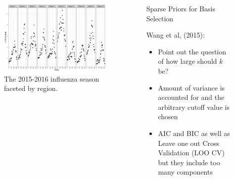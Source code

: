 \documentclass[final]{beamer}
\newlength{\sepwid}
\newlength{\onecolwid}
\newlength{\twocolwid}
\begin{document}
\begin{frame}[t]
\begin{columns}[t]
\begin{column}{\onecolwid}
\begin{figure}
\includegraphics[width=\linewidth]{plots/ILI.png}
\caption{The 2015-2016 influenza season faceted by region.}
\end{figure}


\end{column} %

\begin{column}{\sepwid}\end{column} %

\begin{column}{\twocolwid} %

\begin{columns}[t,totalwidth=\twocolwid] %

\begin{column}{\onecolwid}\vspace{-.6in} %


\begin{block}{Sparse Priors for Basis Selection}

Wang et al, (2015):
\begin{itemize}
\item Point out the question of how large should $k$ be?
\item Amount of variance is accounted for and the arbitrary cutoff value is chosen
\item AIC and BIC as well as Leave one out Cross Validation (LOO CV) but they include too many components \\
\end{itemize}


\end{block}
\end{column}
\end{columns}
\end{column}
\end{columns}
\end{frame}
\end{document}
